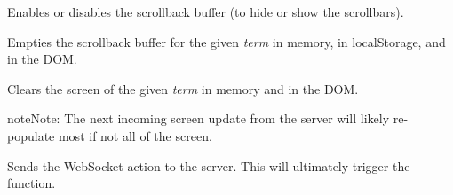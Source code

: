 \documentclass[letterpaper,10pt,openany]{sphinxmanual}
\begin{document}
\begin{fulllineitems}
\label{Applications/terminal/js_terminal:GateOne.Terminal.toggleScrollback}
Enables or disables the scrollback buffer (to hide or show the scrollbars).

\end{fulllineitems}


\begin{fulllineitems}
\label{Applications/terminal/js_terminal:GateOne.Terminal.clearScrollback}
Empties the scrollback buffer for the given \emph{term} in memory, in localStorage, and in the DOM.

\end{fulllineitems}


\begin{fulllineitems}
\label{Applications/terminal/js_terminal:GateOne.Terminal.clearScreen}
Clears the screen of the given \emph{term} in memory and in the DOM.

\begin{notice}{note}{Note:}
The next incoming screen update from the server will likely re-populate most if not all of the screen.
\end{notice}

\end{fulllineitems}


\begin{fulllineitems}
\label{Applications/terminal/js_terminal:GateOne.Terminal.getLocations}
Sends the  WebSocket action to the server.  This will ultimately trigger the {\hyperref[Applications/terminal/js_terminal:GateOne.Terminal.locationsAction]{}} function.

\end{fulllineitems}

\end{document}
